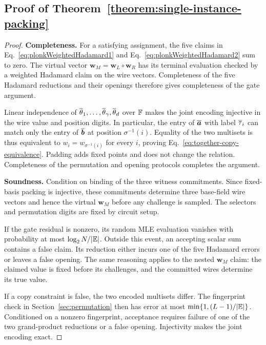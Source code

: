 \subsection{Proof of Theorem~\ref{theorem:single-instance-packing}}
\label{appx:proof-single-instance}

\begin{proof}
\noindent\textbf{Completeness.}
For a satisfying assignment, the five claims in
Eq.~\eqref{eq:plonkWeightedHadamard1} and
Eq.~\eqref{eq:plonkWeightedHadamard2} sum to zero.
The virtual vector \(\bm w_M=\bm w_L\circ\bm w_R\) has its
terminal evaluation checked by a weighted Hadamard claim on the
wire vectors. Completeness of the five Hadamard reductions and
their openings therefore gives completeness of the gate argument.

Linear independence of
\(\overline{\theta}_1,\ldots,\overline{\theta}_\gamma,\overline{\theta}_d\) over
\({\mathbb{F}}\) makes the joint encoding injective in the wire value
and position digits.
In particular, the entry of \(\overline{\bm a}\) with label
\(\overline{\tau}_i\) can match only the entry of \(\overline{\bm b}\)
at position \(\sigma^{-1}(i)\).
Equality of the two multisets is thus equivalent to
\(w_i=w_{\sigma^{-1}(i)}\) for every \(i\), proving
Eq.~\eqref{eq:together-copy-equivalence}.
Padding adds fixed points and does not change the relation.
Completeness of the permutation and opening protocols completes
the argument.

\smallskip\noindent\textbf{Soundness.}
Condition on binding of the three witness commitments.
Since fixed-basis packing is injective, these commitments determine
three base-field wire vectors and hence the virtual \(\bm w_M\)
before any challenge is sampled.
The selectors and permutation digits are fixed by circuit setup.

If the gate residual is nonzero, its random MLE evaluation
vanishes with probability at most \(\log_2N/|\mathbb{E}|\).
Outside this event, an accepting scalar sum contains a false
claim. Its reduction either incurs one of the five Hadamard
errors or leaves a false opening. The same reasoning applies to
the nested \(\bm w_M\) claim: the claimed value is fixed before
its challenges, and the committed wires determine its true value.

If a copy constraint is false, the two encoded multisets differ.
The fingerprint check in Section~\ref{sec:permutation} then has
error at most \(\min\{1,(L-1)/|\mathbb{E}|\}\).
Conditioned on a nonzero fingerprint, acceptance requires failure
of one of the two grand-product reductions or a false opening.
Injectivity makes the joint encoding exact.


\end{proof}
